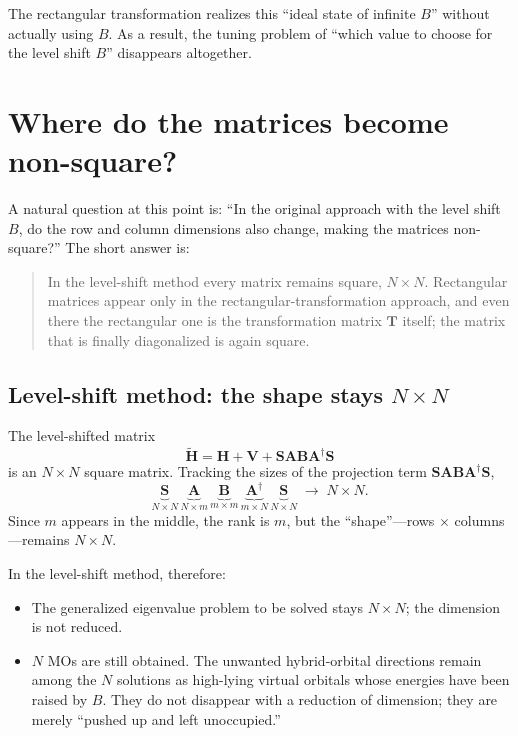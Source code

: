 \documentclass[11pt]{article}
\newcommand{\Hcore}{\mathbf H}
\newcommand{\Venv}{\mathbf V}
\newcommand{\Smat}{\mathbf S}
\newcommand{\Amat}{\mathbf A}
\newcommand{\Bmat}{\mathbf B}
\newcommand{\Tmat}{\mathbf T}
\begin{document}
The rectangular transformation realizes this ``ideal state of infinite
\(B\)'' without actually using \(B\). As a result, the tuning problem
of ``which value to choose for the level shift \(B\)'' disappears
altogether.

\section{Where do the matrices become non-square?}

A natural question at this point is: ``In the original approach with
the level shift \(B\), do the row and column dimensions also change,
making the matrices non-square?'' The short answer is:

\begin{quote}
In the level-shift method every matrix remains square,
\(N\times N\). Rectangular matrices appear only in the
rectangular-transformation approach, and even there the rectangular
one is the transformation matrix \(\Tmat\) itself; the matrix that is
finally diagonalized is again square.
\end{quote}

\subsection{Level-shift method: the shape stays \(N\times N\)}

The level-shifted matrix
\[
  \widetilde{\Hcore}
  =
  \Hcore+\Venv+\Smat\Amat\Bmat\Amat^\dagger\Smat
\]
is an \(N\times N\) square matrix. Tracking the sizes of the projection
term \(\Smat\Amat\Bmat\Amat^\dagger\Smat\),
\[
  \underbrace{\Smat}_{N\times N}\,
  \underbrace{\Amat}_{N\times m}\,
  \underbrace{\Bmat}_{m\times m}\,
  \underbrace{\Amat^\dagger}_{m\times N}\,
  \underbrace{\Smat}_{N\times N}
  \;\longrightarrow\; N\times N .
\]
Since \(m\) appears in the middle, the rank is \(m\), but the
``shape''---rows \(\times\) columns---remains \(N\times N\).

In the level-shift method, therefore:

\begin{itemize}
\item The generalized eigenvalue problem to be solved stays
      \(N\times N\); the dimension is not reduced.
\item \(N\) MOs are still obtained. The unwanted hybrid-orbital
      directions remain among the \(N\) solutions as high-lying virtual
      orbitals whose energies have been raised by \(B\). They do not
      disappear with a reduction of dimension; they are merely ``pushed
      up and left unoccupied.''
\end{itemize}
\end{document}
